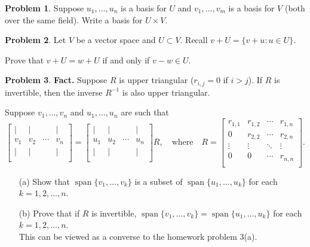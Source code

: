 \documentclass[12pt]{article}
\theoremstyle{definition}
\newtheorem{problem}{Problem}
\begin{document}
\begin{problem}
    Suppose $u_1, \ldots, u_n$ is a basis for $U$ and $v_1, \ldots, v_m$ is a basis for $V$ (both over the same field).
    Write a basis for $U\times V$.
\end{problem}

\begin{problem}
    Let $V$ be a vector space and $U\subset V$. 
    Recall $v+U = \{v+u : u\in U\}$.

    Prove that $v+U = w+U$ if and only if $v-w\in U$.
\end{problem}



\begin{problem}
    
    \textbf{Fact.}
    Suppose $R$ is upper triangular ($r_{i,j} = 0$ if $i>j$).
    If $R$ is invertible, then the inverse $R^{-1}$ is also upper triangular.


    Suppose $v_1, \ldots, v_n$ and $u_1, \ldots, u_n$ are such that 
        \[
        \begin{bmatrix}
            | & | & & | \\
            v_1 & v_2 & \cdots & v_n \\
            | & | & & | \\
        \end{bmatrix}
        =
        \begin{bmatrix}
            | & | & & | \\
            u_1 & u_2 & \cdots & u_n \\
            | & | & & | \\
        \end{bmatrix}
        R
        ,\quad\text{where}\quad
        R = 
        \begin{bmatrix}
            r_{1,1} & r_{1,2} & \cdots & r_{1,n} \\
            0 & r_{2,2} & \cdots & r_{2,n} \\
            \vdots & \vdots & \ddots & \vdots \\
            0 & 0 & \cdots & r_{n,n} \\
        \end{bmatrix}.
        \]
        
        \begin{enumerate}
            \item[(a)] Show that
            $\operatorname{span}\{v_1, \ldots, v_k\}$ is a subset of $\operatorname{span}\{u_1, \ldots, u_k\}$ for each $k=1,2, \ldots, n$.
            \item[(b)] 
            Prove that if $R$ is invertible,  $\operatorname{span}\{v_1, \ldots, v_k\} = \operatorname{span}\{u_1, \ldots, u_k\}$ for each $k=1,2, \ldots, n$.
            \\This can be viewed as a converse to the homework problem 3(a).
        \end{enumerate}
        
   
\end{problem}
\end{document}
